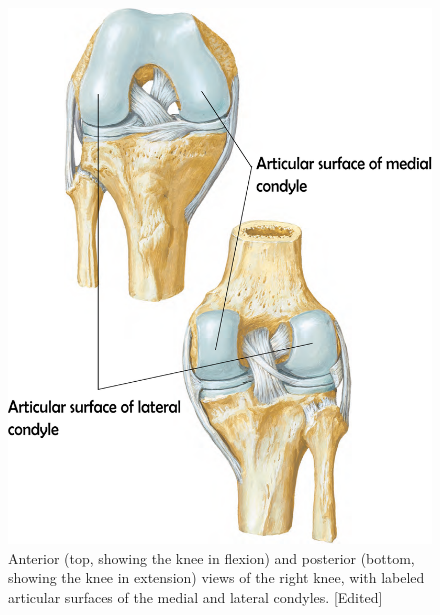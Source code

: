 \documentclass{micro-econ-thesis}
\begin{document}
\begin{figure}[H]
	\centering
	\includegraphics[scale=0.3]{right_knee_labeled}
	\caption{Anterior (top, showing the knee in flexion) and posterior (bottom, showing the knee in extension) views of the right knee, with labeled articular surfaces of the medial and lateral condyles. [Edited] \parencite[p.519]{netter_519_2023}}
	\label{fig:rightkneeplate519}
\end{figure}
\end{document}
